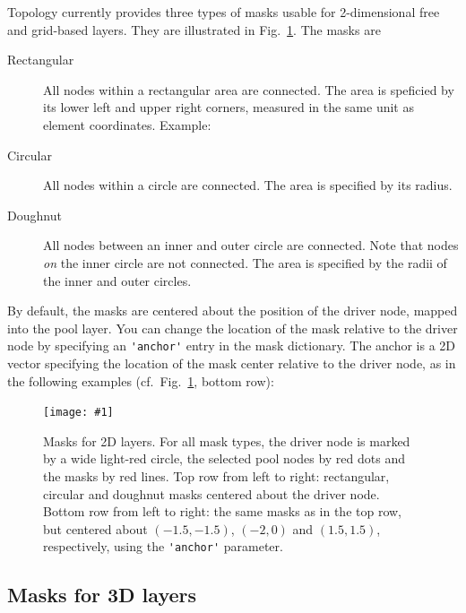 \documentclass[a4paper,12pt]{report}
\newcommand{\scriptfig}[4]{%
\begin{figure}
\centerline{\texttt{[image: \#1]}}
\caption[#3]{#4}
\label{fig:#1}
\end{figure}%
}
\begin{document}
Topology currently provides three types of masks usable for 2-dimensional
free and grid-based layers. They are illustrated in Fig.~\ref{fig:conn2}.
The masks are
\begin{description}
\item[Rectangular] All nodes within a rectangular
  area are connected. The area is speficied by its lower left and
  upper right corners, measured in the same unit as element
  coordinates. Example:

\item[Circular] All nodes within a circle are
  connected.  The area is specified by its radius.

\item[Doughnut] All nodes between an inner and outer
  circle are connected. Note that nodes \emph{on} the inner circle are
  not connected. The area is specified by the radii of the inner and
  outer circles.

\end{description}
By default, the masks are centered about the position of the driver
node, mapped into the pool layer. You can change the location of the
mask relative to the driver node by specifying an
\lstinline!'anchor'! entry in the mask dictionary. The
anchor is a 2D vector specifying the location of the mask center
relative to the driver node, as in the following examples (cf.\
Fig.~\ref{fig:conn2}, bottom row):




\scriptfig{conn2}{0.9}{Masks for 2D layers}%
{Masks for 2D layers. For all mask types, the driver node is
  marked by a wide light-red circle, the selected pool nodes by red
  dots and the masks by red lines. Top row from left to right:
  rectangular, circular and doughnut masks centered about the driver
  node.
Bottom row from left to right: the same masks as in the top row, but
centered about $(-1.5,-1.5)$, $(-2,0)$ and $(1.5,1.5)$, respectively,
using the \lstinline!'anchor'! parameter.}


\subsection{Masks for 3D layers}\label{sec:3d_masks}
\end{document}
